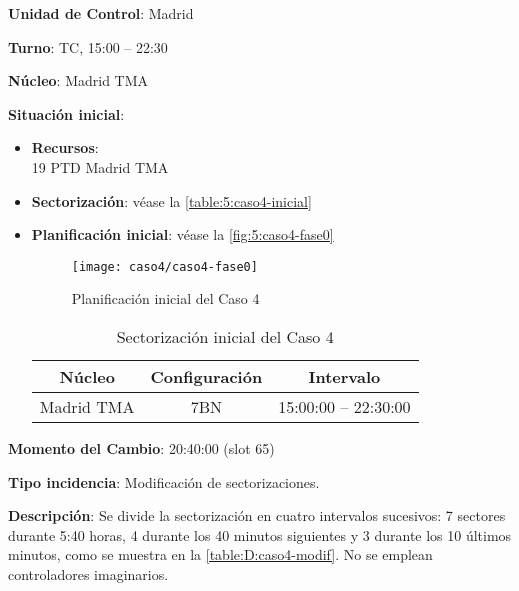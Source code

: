 \textbf{Unidad de Control}: Madrid

\textbf{Turno}: TC, 15:00 -- 22:30

\textbf{Núcleo}: Madrid TMA

\textbf{Situación inicial}:
\begin{itemize}[label={}]
	
	\item \textbf{Recursos}: \\
	19 PTD Madrid TMA
	
	\item \textbf{Sectorización}: véase la \autoref{table:5:caso4-inicial}
	
	\item \textbf{Planificación inicial}: véase la \autoref{fig:5:caso4-fase0}
	
	\begin{figure}[!h]
		\centering
		\texttt{[image: caso4/caso4-fase0]}
		\caption{Planificación inicial del Caso 4}
		\label{fig:5:caso4-fase0}
	\end{figure}

	\begin{table}[h]
		\centering
		\caption{Sectorización inicial del Caso 4}
		\label{table:5:caso4-inicial}
		\begin{tabular}{ccc}
			\hline
			\textbf{Núcleo} & \textbf{Configuración} & \textbf{Intervalo} \\ \hline
			Madrid TMA             & 7BN                                      & 15:00:00 -- 22:30:00                \\ \hline
		\end{tabular}
	\end{table}
\end{itemize}

\textbf{Momento del Cambio}: 20:40:00  (slot 65)

\textbf{Tipo incidencia}: Modificación de sectorizaciones.

\textbf{Descripción}: Se divide la sectorización en cuatro intervalos sucesivos: 7 sectores durante 5:40 horas, 4 durante los 40 minutos siguientes y 3 durante los 10 últimos minutos, como se muestra en la \autoref{table:D:caso4-modif}. No se emplean controladores imaginarios.


